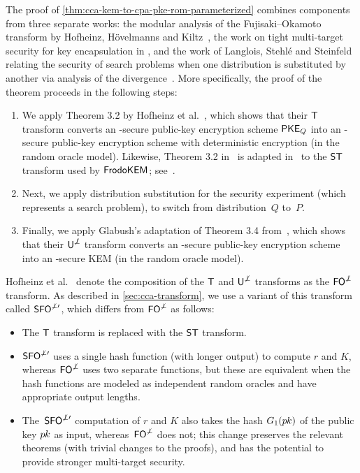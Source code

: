 The proof of \autoref{thm:cca-kem-to-cpa-pke-rom-parameterized}
combines components from three separate works: the modular analysis of
the Fujisaki--Okamoto transform by Hofheinz, H{\"o}velmanns and Kiltz~\cite{TCC:HofHovKil17}, the work on tight multi-target security for key encapsulation in \cite{GlabushThesis}, and the
work of Langlois, Stehl{\' e} and Steinfeld relating the security of
search problems when one distribution is substituted by another via
analysis of the \renyi divergence~\cite{EC:LanSteSte14}.  More
specifically, the proof of the theorem proceeds in the following
steps:
\begin{enumerate}
\item We apply Theorem 3.2 by Hofheinz et al.~\cite{TCC:HofHovKil17}, which shows that their $\textsf{\upshape\mdseries T}$
  transform converts an \INDCPA-secure public-key encryption scheme
  $\textsf{\upshape\mdseries PKE}_{Q}$ into an \OWPCA-secure public-key encryption scheme with
  deterministic encryption (in the random oracle model). Likewise, Theorem 3.2 in~\cite{TCC:HofHovKil17} is adapted in~\cite{GlabushThesis} to the $\textsf{\upshape\mdseries ST}$ transform used by $\textsf{\upshape\mdseries FrodoKEM}$; see~\cite[Section 4.2]{GlabushThesis}.
\item Next, we apply distribution substitution for the \OWPCA security
  experiment (which represents a search problem), to switch from
  distribution~$Q$ to~$P$.
\item Finally, we apply Glabush's adaptation of Theorem 3.4 from~\cite{TCC:HofHovKil17}, which shows that their
  $\textsf{\upshape\mdseries U}^{\not\perp}$ transform converts an \MOWPCA-secure public-key
  encryption scheme into an \MINDCCA-secure KEM (in the random oracle
  model).
\end{enumerate}

Hofheinz et al.~\cite{TCC:HofHovKil17} denote the composition of the $\textsf{\upshape\mdseries T}$ and $\textsf{\upshape\mdseries U}^{\not\perp}$ transforms as
the $\textsf{\upshape\mdseries FO}^{\not\perp}$ transform.  As described in
\autoref{sec:cca-transform}, we use a variant of this
transform called $\textsf{\upshape\mdseries SFO}^{\not\perp\prime}$, which differs from
$\textsf{\upshape\mdseries FO}^{\not\perp}$ as follows:
\begin{itemize}
\item The $\textsf{\upshape\mdseries T}$ transform is replaced with the $\textsf{\upshape\mdseries ST}$ transform.
\item $\textsf{\upshape\mdseries SFO}^{\not\perp\prime}$ uses a single hash function (with longer
  output) to compute $r$ and $K$, whereas $\textsf{\upshape\mdseries FO}^{\not\perp}$ uses two
  separate functions, but these are equivalent when the hash functions
  are modeled as independent random oracles and have appropriate
  output lengths.
\item The~$\textsf{\upshape\mdseries SFO}^{\not\perp\prime}$ computation of $r$ and $K$ also takes the
  hash $G_1(p\mkern-0.5muk)$ of the public key $p\mkern-0.5muk$ as input,
  whereas~$\textsf{\upshape\mdseries FO}^{\not\perp}$ does not; this change preserves the relevant
  theorems (with trivial changes to the proofs), and has the potential
  to provide stronger multi-target security.
\end{itemize}


